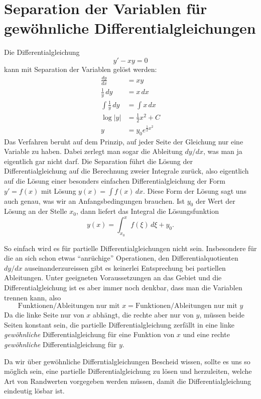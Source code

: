 %
%
%
\section{Separation der Variablen für gewöhnliche Differentialgleichungen}
Die Differentialgleichung 
\begin{equation}
y'-xy=0
\label{separation:ode}
\end{equation}
kann mit Separation der Variablen gelöst werden:
\begin{align*}
\frac{dy}{dx}&=xy\\
\frac1y\,dy&=x\,dx\\
\int\frac1y\,dy&=\int x\,dx\\
\log|y|&=\frac12x^2+C\\
y&=y_0e^{\frac12x^2}
\end{align*}
Das Verfahren beruht auf dem Prinzip, auf jeder Seite der Gleichung
nur eine Variable zu haben.
Dabei zerlegt man sogar die Ableitung $dy/dx$, was man ja eigentlich
gar nicht darf.
Die Separation führt die Lösung der Differentialgleichung auf die
Berechnung zweier Integrale zurück, also eigentlich auf die
Lösung einer besonders einfachen Differentialgleichung der Form $y'=f(x)$
mit Lösung $y(x)=\int f(x)\,dx$.
Diese Form der Lösung sagt uns auch genau, was wir an Anfangsbedingungen
brauchen.
Ist $y_0$ der Wert der Lösung an der Stelle $x_0$, dann liefert
das Integral die Lösungsfunktion
\[
y(x)=\int_{x_0}^xf(\xi)\,d\xi + y_0.
\]

So einfach wird es für partielle Differentialgleichungen nicht sein.
Insbesondere für die an sich schon etwas ``anrüchige'' Operationen,
den Differentialquotienten $dy/dx$ auseinanderzureissen gibt es keinerlei
Entsprechung bei partiellen Ableitungen.
Unter geeigneten Voraussetzungen an das Gebiet und die Differentialgleichung
ist es aber immer noch denkbar, dass man die Variablen trennen kann,
also 
\[
\text{Funktionen/Ableitungen nur mit $x$} = \text{Funktionen/Ableitungen nur mit $y$}
\]
Da die linke Seite nur von $x$ abhängt, die rechte aber nur von $y$, müssen
beide Seiten konstant sein, die partielle Differentialgleichung zerfällt
in eine linke {\em gewöhnliche} Differentialgleichung für eine Funktion von
$x$ und eine rechte {\em gewöhnliche} Differentialgleichung für $y$.

Da wir über gewöhnliche Differntialgleichungen Bescheid wissen, sollte
es uns so möglich sein, eine partielle Differentialgleichung zu lösen
und herzuleiten, welche Art von Randwerten vorgegeben werden müssen, damit
die Differentialgleichung eindeutig lösbar ist.

